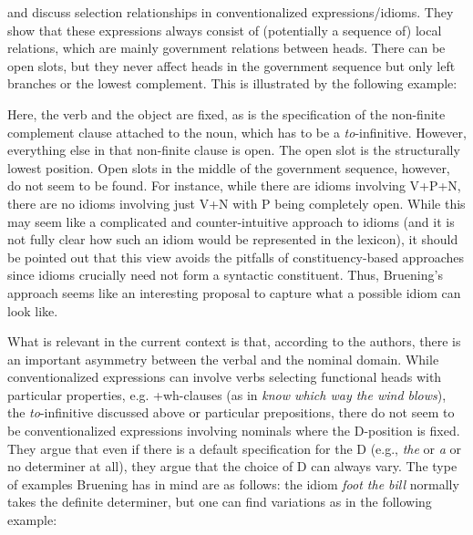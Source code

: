 \documentclass[output=paper,colorlinks,citecolor=black,
]{langscibook}
\begin{document}
 \citet{Bruening-et-al:2018:Selection-Idioms-NP} and \citet{Bruening:2020:NP-DP} discuss selection relationships in conventionalized expressions/idioms. They show that these expressions always consist of (potentially a sequence of) local relations, which are mainly government relations between heads. There can be open slots, but they never affect heads in the government sequence but only left branches or the lowest complement. This is illustrated by the following  example:

\largerpage
    \z
 
\noindent
Here, the verb and the object are fixed, as is the specification of the non-finite complement clause attached to the noun, which has to be a \textit{to}-infinitive. However, everything else in that non-finite clause is open. The open slot is the structurally lowest position. Open slots in the middle of the government sequence, however, do not seem to be found. For instance, while there are idioms involving V+P+N, there are no idioms involving just V+N with P being completely open. While this may seem like a complicated and counter-intuitive approach to idioms (and it is not fully clear how such an idiom would be represented in the lexicon), it should be pointed out that this view avoids the pitfalls of constituency-based approaches since idioms crucially need not form a syntactic constituent. Thus, Bruening's approach seems like an interesting proposal to capture what a possible idiom can look like.
 
 What is relevant in the current context is that, according to the authors, there is an important asymmetry between the verbal and the nominal domain. While conventionalized expressions can involve verbs selecting functional heads with particular properties, e.g. +wh-clauses (as in \textit{know which way the wind blows}), the \textit{to}-infinitive discussed above or particular prepositions, there do not seem to be conventionalized expressions involving nominals where the D-position is fixed. They argue that even if there is a default specification for the D (e.g., \textit{the} or \textit{a} or no determiner at all), they argue that the choice of D can always vary. The type of examples Bruening has in mind are as follows: the idiom \textit{foot the bill} normally takes the definite determiner, but one can find variations as in the following example:
 
\end{document}
